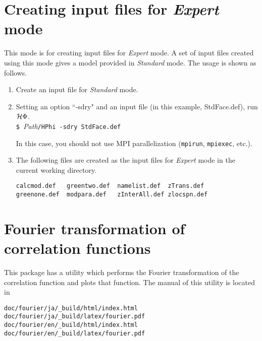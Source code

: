 \section{Creating input files for {\it Expert} mode}
This mode is for creating input files for {\it Expert} mode.
A set of input files created using this mode gives a model provided in {\it Standard} mode.
The usage is shown as follows.
\begin{enumerate}
\item{Create an input file for {\it Standard} mode.}
\item{Setting an option ``-sdry" and an input file (in this example, StdFace.def), run $\mathcal{H} \Phi$.}\\
\verb|$ |\textit{Path}\verb|/HPhi -sdry StdFace.def|

In this case, you should not use MPI parallelization (\verb|mpirun|, \verb|mpiexec|, etc.).
\item{The following files are created as the input files for {\it Expert} mode in the current working directory.}\\
\begin{minipage}{12cm}
\begin{screen}
\begin{verbatim}
calcmod.def   greentwo.def  namelist.def  zTrans.def
greenone.def  modpara.def   zInterAll.def zlocspn.def
\end{verbatim}
\end{screen}
\end{minipage}
\end{enumerate}

\section{Fourier transformation of correlation functions}

This package has a utility which performs the Fourier transformation of the correlation function and plots that function.
The manual of this utility is located in
\begin{verbatim}
doc/fourier/ja/_build/html/index.html
doc/fourier/ja/_build/latex/fourier.pdf
doc/fourier/en/_build/html/index.html
doc/fourier/en/_build/latex/fourier.pdf
\end{verbatim}
